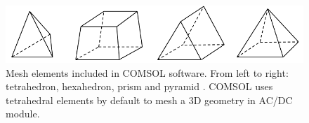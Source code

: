 \begin{figure}[ht]
	\includegraphics[width=\textwidth]{03_Prototype/figures/00_fig/fig006_COMSOL_meshing_elements.png}
	\caption[3D Mesh elements included in COMSOL]{Mesh elements included in COMSOL software. From left to right: tetrahedron, hexahedron, prism and pyramid \cite{mesh2013}. COMSOL uses tetrahedral elements by default to mesh a 3D geometry in AC/DC module.}
	\label{chap3:COMSOL_meshing_elements}
\end{figure}
